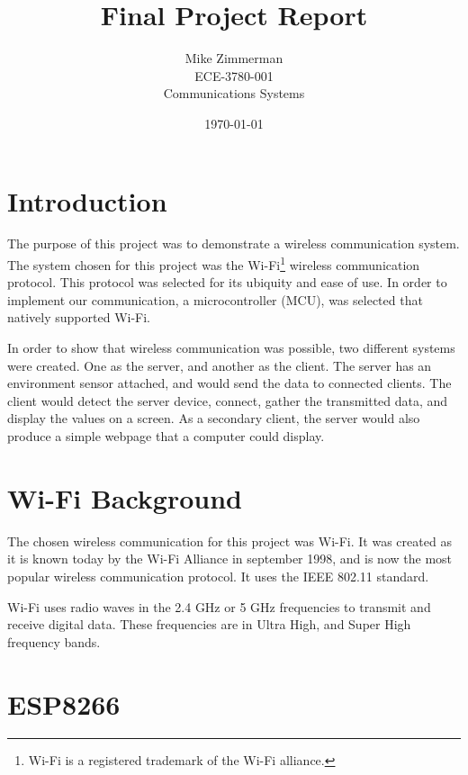 \documentclass[onecolumn, 12pt]{IEEEConf}
\title{Final Project Report}
\author{Mike Zimmerman \\ ECE-3780-001 \\ Communications Systems}
\date{\today}
\begin{document}
    \maketitle
    \doublespacing
    \section{Introduction}
        The purpose of this project was to demonstrate a wireless communication system.
        The system chosen for this project was the Wi-Fi\footnote{Wi-Fi is a registered trademark of the Wi-Fi alliance.} wireless communication protocol.
        This protocol was selected for its ubiquity and ease of use.
        In order to implement our communication, a microcontroller (MCU), was selected that natively supported Wi-Fi.

        In order to show that wireless communication was possible, two different systems were created.
        One as the server, and another as the client.
        The server has an environment sensor attached, and would send the data to connected clients.
        The client would detect the server device, connect, gather the transmitted data, and display the values on a screen.
        As a secondary client, the server would also produce a simple webpage that a computer could display.

    \section{Wi-Fi Background}
        The chosen wireless communication for this project was Wi-Fi.
        It was created as it is known today by the Wi-Fi Alliance in september 1998, and is now the most popular wireless communication protocol.\cite{Wi-Fi_History}
        It uses the IEEE 802.11 standard. 

        Wi-Fi uses radio waves in the 2.4 GHz or 5 GHz frequencies to transmit and receive digital data.
        These frequencies are in Ultra High, and Super High frequency bands.


    \section{ESP8266}

\end{document}

